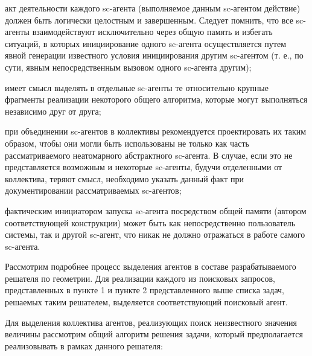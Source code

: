 \begin{SCn}
{\begin{scnitemize}
\begin{scnitemizeii}
\begin{scnenumerate}
\item акт деятельности каждого sc-агента (выполняемое данным sc-агентом действие) должен быть логически целостным и завершенным. Следует помнить, что все sc-агенты взаимодействуют исключительно через общую память и избегать ситуаций, в которых инициирование одного sc-агента осуществляется путем явной генерации известного условия инициирования другим \mbox{sc-агентом} (т. е., по сути, явным непосредственным вызовом одного sc-агента другим);

\item имеет смысл выделять в отдельные sc-агенты те относительно крупные фрагменты реализации некоторого общего алгоритма, которые могут выполняться независимо друг от друга;
\end{scnenumerate}

\item при объединении sc-агентов в коллективы рекомендуется проектировать их таким образом, чтобы они могли быть использованы не только как часть рассматриваемого неатомарного абстрактного sc-агента. В случае, если это не представляется возможным и некоторые sc-агенты, будучи отделенными от коллектива, теряют смысл, необходимо указать данный факт при документировании рассматриваемых sc-агентов;

\item фактическим инициатором запуска sc-агента посредством общей памяти (автором соответствующей конструкции) может быть как непосредственно пользователь системы, так и другой sc-агент, что никак не должно отражаться в работе самого sc-агента.
\end{scnitemizeii}

Рассмотрим подробнее процесс выделения агентов в составе разрабатываемого решателя по геометрии. Для реализации каждого из поисковых запросов, представленных в пункте 1 и пункте 2 представленного выше списка задач, решаемых таким решателем, выделяется соответствующий поисковый агент.

Для выделения коллектива агентов, реализующих поиск неизвестного значения величины рассмотрим общий алгоритм решения задачи, который предполагается реализовывать в рамках данного решателя:


\end{scnitemize}}
\end{SCn}
